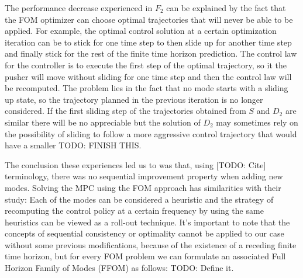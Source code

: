 \documentclass[12,twoside]{TFG-GM}
\theoremstyle{definition}
\theoremstyle{remark}
\begin{document}
The performance decrease experienced in $F_2$ can be explained by the fact that the FOM optimizer can choose optimal trajectories that will never be able to be applied. For example, the optimal control solution at a certain optimization iteration can be to stick for one time step to then slide up for another time step and finally stick for the rest of the finite time horizon prediction. The control law for the controller is to execute the first step of the optimal trajectory, so it the pusher will move without sliding for one time step and then the control law will be recomputed. The problem lies in the fact that no mode starts with a sliding up state, so the trajectory planned in the previous iteration is no longer considered. If the first sliding step of the trajectories obtained from $S$ and $D_2$ are similar there will be no appreciable but the solution of $D_2$ may sometimes rely on the possibility of sliding to follow a more aggressive control trajectory that would have a smaller TODO: FINISH THIS. 

The conclusion these experiences led us to was that, using [TODO: Cite] terminology, there was no sequential improvement property when adding new modes.
Solving the MPC using the FOM approach has similarities with their study: Each of the modes can be considered a heuristic and the strategy of recomputing the control policy at a certain frequency by using the same heuristics can be viewed as a roll-out technique. It's important to note that the concepts of sequential consistency or optimality cannot be applied to our case without some previous modifications, because of the existence of a receding finite time horizon, but for every FOM problem we can formulate an associated Full Horizon Family of Modes (FFOM) as follows: TODO: Define it.
\end{document}
